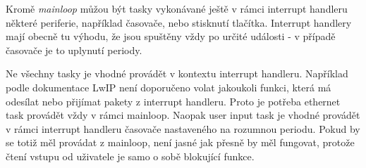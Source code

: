 Kromě \emph{mainloop} můžou být tasky vykonávané ještě v rámci interrupt handleru některé
periferie, například časovače, nebo stisknutí tlačítka.
Interrupt handlery mají obecně tu výhodu, že jsou spuštěny vždy po určité události -
v případě časovače je to uplynutí periody.

Ne všechny tasky je vhodné provádět v kontextu interrupt handleru.
Například podle dokumentace LwIP není doporučeno volat jakoukoli funkci, která má odesílat
nebo přijímat pakety z interrupt handleru.
Proto je potřeba ethernet task provádět vždy v rámci mainloop.
Naopak user input task je vhodné provádět v rámci interrupt handleru časovače nastaveného
na rozumnou periodu.
Pokud by se totiž měl provádat z mainloop, není jasné jak přesně by měl fungovat, protože čtení
vstupu od uživatele je samo o sobě blokující funkce.


